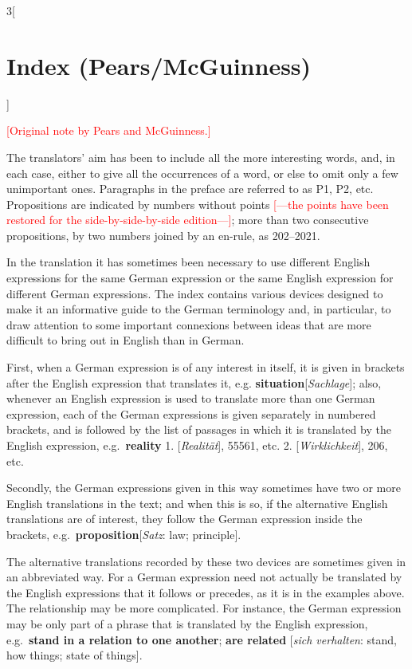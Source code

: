 \documentclass[oneside,openany,12pt]{book}
\newcommand{\kckaddition}[1]{\textcolor{red}{#1}}
\begin{document}
\begin{multicols}{3}[\section*{Index (Pears/McGuinness)}]

\begin{center}
\kckaddition{[Original note by Pears and McGuinness.]}
\end{center}


\noindent The translators' aim has been to include all the more interesting words, and, in each case, either to give all the occurrences of a word, or else to omit only a few unimportant ones. Paragraphs in the preface are referred to as P1, P2, etc. Propositions are indicated by numbers without points \kckaddition{[---the points have been restored for the side-by-side-by-side edition---]}; more than two consecutive propositions, by two numbers joined by an en-rule, as 202--2021.

In the translation it has sometimes been necessary to use different English expressions for the same German expression or the same English expression for different German expressions. The index contains various devices designed to make it an informative guide to the German terminology and, in particular, to draw attention to some important connexions between ideas that are more difficult to bring out in English than in German.

First, when a German expression is of any interest in itself, it is given in brackets after the English expression that translates it, e.g. \textbf{situation}[\textit{Sachlage}]; also, whenever an English expression is used to translate more than one German expression, each of the German expressions is given separately in numbered brackets, and is followed by the list of passages in which it is translated by the English expression, e.g.\ \textbf{reality} 1. [\textit{Realit{\"a}t}], 55561, etc. 2. [\textit{Wirklichkeit}], 206, etc.

Secondly, the German expressions given in this way sometimes have two
or more English translations in the text; and when this is so, if the alternative English translations are of interest, they follow the German expression inside the brackets, e.g.\ \textbf{proposition}[\textit{Satz}: law; principle].

The alternative translations recorded by these two devices are sometimes given in an abbreviated way. For a German expression need not actually be translated by the English expressions that it follows or precedes, as it is in the examples above. The relationship may be more complicated. For instance, the German expression may be only part of a phrase that is translated by the English expression, e.g.\ \textbf{stand in a relation to one another}; \textbf{are related}
[\textit{sich verhalten}: stand, how things; state of things].


\end{multicols}
\end{document}
